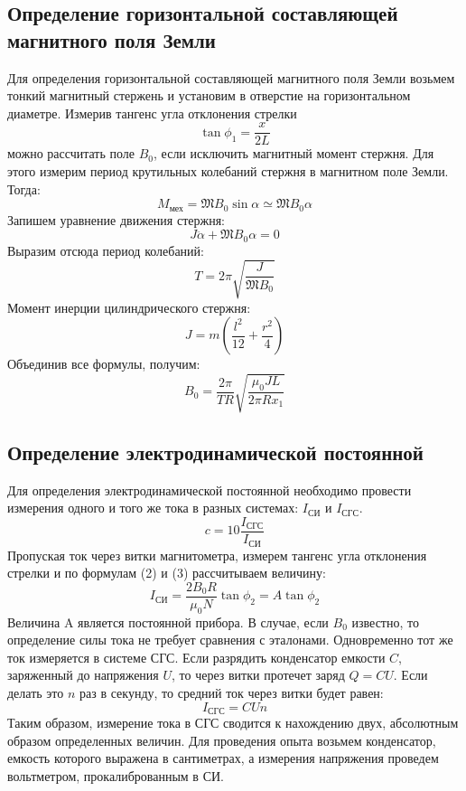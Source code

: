 \documentclass[a4paper,12pt]{article}
\begin{document}
		\subsection{Определение горизонтальной составляющей магнитного поля Земли}
		Для определения горизонтальной составляющей магнитного поля Земли возьмем тонкий магнитный стержень и установим в отверстие на горизонтальном диаметре. Измерив тангенс угла отклонения стрелки
		\begin{equation}
			\tan \phi_1 = \frac{x}{2L}	 
		\end{equation}
		можно рассчитать поле $B_0$, если исключить магнитный момент стержня. Для этого измерим период крутильных колебаний стержня в магнитном поле Земли. Тогда:
		\begin{equation*}
			M_{\text{мех}} = \mathfrak{M}B_0\sin\alpha \simeq \mathfrak{M}B_0\alpha
		\end{equation*}
		Запишем уравнение движения стержня:
		\begin{equation*}
			J\ddot{\alpha}+\mathfrak{M}B_0\alpha = 0
		\end{equation*}
		Выразим отсюда период колебаний:
		\begin{equation}
			T = 2\pi\sqrt{\frac{J}{\mathfrak{M}B_0}}
		\end{equation}
		Момент инерции цилиндрического стержня:
		\begin{equation}
			J = m\left(\frac{l^2}{12}+\frac{r^2}{4}\right)
		\end{equation}
		Объединив все формулы, получим:
		\begin{equation}
			B_0 = \frac{2\pi}{TR}\sqrt{\frac{\mu_0JL}{2\pi Rx_1}}
		\end{equation}
		\subsection{Определение электродинамической постоянной}
		Для определения электродинамической постоянной необходимо провести измерения одного и того же тока в разных системах: $I_{\text{СИ}}$ и $I_{\text{СГС}}$.
		\begin{equation}
			c = 10\frac{I_{\text{СГС}}}{I_{\text{СИ}}}
		\end{equation}
		Пропуская ток через витки магнитометра, измерем тангенс угла отклонения стрелки и по формулам (2) и (3) рассчитываем величину:
		\begin{equation}
			I_{\text{СИ}} = \frac{2B_0R}{\mu_0N}\tan\phi_2 = A\tan\phi_2
		\end{equation}
		Величина A является постоянной прибора.
		В случае, если $B_0$ известно, то определение силы тока не требует сравнения с эталонами. Одновременно тот же ток измеряется в системе СГС. Если разрядить конденсатор емкости $C$, заряженный до напряжения $U$, то через витки протечет заряд $Q=CU$. Если делать это $n$ раз в секунду, то средний ток через витки будет равен:
		\begin{equation}
			I_{\text{СГС}} = CUn
		\end{equation}
		Таким образом, измерение тока в СГС сводится к нахождению двух, абсолютным образом определенных величин.
		Для проведения опыта возьмем конденсатор, емкость которого выражена в сантиметрах, а измерения напряжения проведем вольтметром, прокалиброванным в СИ.
\end{document}
